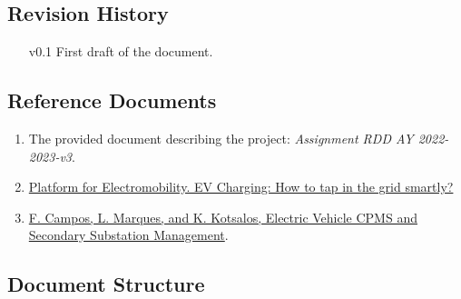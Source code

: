 \documentclass[11pt]{article}
\begin{document}
\subsection{Revision History}

\begin{enumerate}
    \item[v0.1] First draft of the document.
\end{enumerate}

\subsection{Reference Documents}

\begin{enumerate}
    \item The provided document describing the project: \textit{Assignment RDD AY 2022-2023-v3}.
    \item \href{https://www.platformelectromobility.eu/2022/05/17/ev-charging-how-to-tap-in-the-grid-smartly/}{Platform for Electromobility. EV Charging: How to tap in the grid smartly?}
    \item \href{https://mobilityintegrationsymposium.org/wp-content/uploads/sites/10/2018/11/4A_3_Emob18_024_paper_Filipe_Campos.pdf}{F. Campos, L. Marques, and K. Kotsalos, Electric Vehicle CPMS and Secondary Substation Management}.
\end{enumerate}

\subsection{Document Structure}
\end{document}
